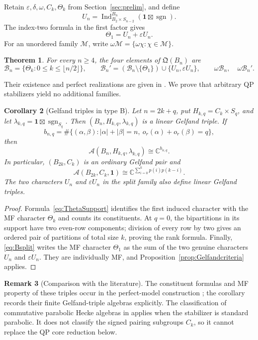 \documentclass[11pt]{article}
\numberwithin{equation}{section}
\newtheorem{theorem}{Theorem}[section]
\newtheorem{corollary}[theorem]{Corollary}
\theoremstyle{definition}
\newtheorem{remark}[theorem]{Remark}
\DeclareMathOperator{\Ind}{Ind}
\DeclareMathOperator{\sgn}{sgn}
\newcommand{\C}{\mathbb C}
\newcommand{\QQ}{\mathfrak Q}
\newcommand{\ee}{\varepsilon}
\newcommand{\dd}{\delta}
\newcommand{\om}{\omega}
\newcommand{\one}{\mathbf 1}
\begin{document}
Retain \(\ee,\dd,\om,C_k,\Theta_k\) from Section~\ref{sec:prelim}, and define
\[
 U_n=\Ind_{B_2\times S_{n-2}}^{B_n}(\one\boxtimes\sgn).
\]
The index-two formula in the first factor gives
\begin{equation}\Theta_1=U_n+\ee U_n.\label{eq:Bsplit}\end{equation}
For an unordered family \(\mathcal M\), write
\(\om\mathcal M=\{\om\chi:\chi\in\mathcal M\}\).

\begin{theorem}\label{thm:B}
For every \(n\geq4\), the four elements of \(\QQ(B_n)\) are
\[
 \mathcal B_n=\{\Theta_k:0\leq k\leq\lfloor n/2\rfloor\},
 \qquad
 \mathcal B_n'=(\mathcal B_n\setminus\{\Theta_1\})\cup\{U_n,\ee U_n\},
 \qquad \om\mathcal B_n,\quad\om\mathcal B_n'.
\]
\end{theorem}
Their existence and perfect realizations are given in \cite[Theorem 4.5]{MZperfect}.
We prove that arbitrary QP stabilizers yield no additional families.

\begin{corollary}[Gelfand triples in type B]
\label{cor:BGelfand}
Let \(n=2k+q\), put \(H_{k,q}=C_k\times S_q\), and let
\(\lambda_{k,q}=\one\boxtimes\sgn_{S_q}\).
Then \((B_n,H_{k,q},\lambda_{k,q})\) is a linear Gelfand triple.
If
\[
 b_{n,q}=\#\{(\alpha,\beta):|\alpha|+|\beta|=n,
          \ o_r(\alpha)+o_r(\beta)=q\},
\]
then
\[
 \mathscr A(B_n,H_{k,q},\lambda_{k,q})\cong\C^{b_{n,q}}.
\]
In particular, \((B_{2k},C_k)\) is an ordinary Gelfand pair and
\[
 \mathscr A(B_{2k},C_k,\one)
 \cong\C^{\sum_{i=0}^k p(i)p(k-i)}.
\]
The two characters \(U_n\) and \(\ee U_n\) in the split family also
define linear Gelfand triples.
\end{corollary}
\begin{proof}
Formula~\eqref{eq:ThetaSupport} identifies the first induced character
with the MF character \(\Theta_k\) and counts its constituents.
At \(q=0\), the bipartitions in its support have two even-row
components; division of every row by two gives an ordered pair of
partitions of total size \(k\), proving the rank formula.
Finally, \eqref{eq:Bsplit} writes the MF character \(\Theta_1\) as the
sum of the two genuine characters \(U_n\) and \(\ee U_n\).
They are individually MF, and Proposition~\ref{prop:Gelfandcriteria}
applies.
\end{proof}

\begin{remark}[Comparison with the literature]
The constituent formulas and MF property of these triples occur in
the perfect-model construction \cite{MZgraphs,MZperfect}; the
corollary records their finite Gelfand-triple algebras explicitly.
The classification of commutative parabolic Hecke algebras in
\cite{APVM} applies when the stabilizer is standard parabolic.
It does not classify the signed pairing subgroups \(C_k\), so it cannot
replace the QP core reduction below.
\end{remark}
\end{document}
